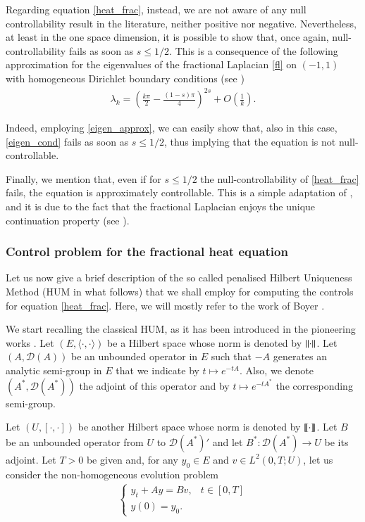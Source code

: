 Regarding equation \eqref{heat_frac}, instead, we are not aware of any null controllability result in the literature, neither positive nor negative. Nevertheless, at least in the one space dimension, it is possible to show that, once again, null-controllability fails as soon as $s\leq 1/2$. This is a consequence of the following approximation for the eigenvalues of the fractional Laplacian \eqref{fl} on $(-1,1)$ with homogeneous Dirichlet boundary conditions (see \cite{kulczycki2010spectral,kwasnicki2012eigenvalues}) 
\begin{align}\label{eigen_approx}
	\lambda_k = \left(\frac{k\pi}{2}-\frac{(1-s)\pi}{4}\right)^{2s}+O\left(\frac{1}{k}\right).
\end{align} 

Indeed, employing \eqref{eigen_approx}, we can easily show that, also in this case, \eqref{eigen_cond} fails as soon as $s\leq 1/2$, thus implying that the equation is not null-controllable. 

Finally, we mention that, even if for $s\leq 1/2$ the null-controllability of \eqref{heat_frac} fails, the equation is approximately controllable. This is a simple adaptation of \cite[Proposition 2.4 and Theorem 2.5]{keyantuo2016interior}, and it is due to the fact that the fractional Laplacian enjoys the unique continuation property (see \cite{fall2014unique}).      

\subsubsection{Control problem for the fractional heat equation}

Let us now give a brief description of the so called penalised Hilbert Uniqueness Method (HUM in what follows) that we shall employ for computing the controls for equation \eqref{heat_frac}. Here, we will mostly refer to the work of Boyer \cite{boyer2013penalised}.

We start recalling the classical HUM, as it has been introduced in the pioneering works \cite{glowinski1995exact,glowinski2008exact}. Let $(E,\langle\cdot,\cdot\rangle)$ be a Hilbert space whose norm is denoted by ${\left\|\cdot\right\|}_{}$. Let $(A,\mathcal D(A))$ be an unbounded operator in $E$ such that $-A$ generates an analytic semi-group in $E$ that we indicate by $t\mapsto e^{-tA}$. Also, we denote $(A^*,\mathcal D(A^*))$ the adjoint of this operator and by $t\mapsto e^{-tA^*}$ the corresponding semi-group. 

Let $(U,[\cdot,\cdot])$ be another Hilbert space whose norm is denoted by $\llbracket \cdot\rrbracket$. Let  $B$ be an unbounded operator from $U$ to $\mathcal D(A^*)'$ and let $B^*:\mathcal D(A^*)\to U$ be its adjoint. Let $T>0$ be given and, for any $y_0\in E$ and $v\in L^2(0,T;U)$, let us consider the non-homogeneous evolution problem  
\begin{align}\label{abstract_pb}
	\begin{cases}
		y_t+Ay=Bv, & t\in[0,T]
		\\
		y(0)=y_0.
	\end{cases}
\end{align}

